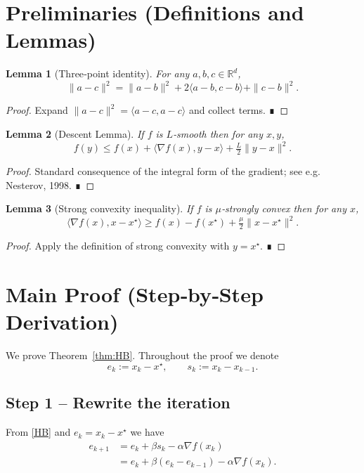 \documentclass{article}
\newtheorem{lemma}{Lemma}
\begin{document}
\section*{Preliminaries (Definitions and Lemmas)}
\begin{lemma}[Three‑point identity]\label{lem:3pt}
For any $a,b,c\in\mathbb{R}^{d}$,
\[
\|a-c\|^{2}= \|a-b\|^{2}+2\langle a-b,c-b\rangle+\|c-b\|^{2}.
\tag{L1}
\]
\end{lemma}
\begin{proof}
Expand $\|a-c\|^{2}=\langle a-c,a-c\rangle$ and collect terms. ∎
\end{proof}

\begin{lemma}[Descent Lemma]\label{lem:descent}
If $f$ is $L$‑smooth then for any $x,y$,
\[
f(y)\le f(x)+\langle\nabla f(x),y-x\rangle+\tfrac{L}{2}\|y-x\|^{2}.
\tag{L2}
\]
\end{lemma}
\begin{proof}
Standard consequence of the integral form of the gradient; see e.g. Nesterov,
1998. ∎
\end{proof}

\begin{lemma}[Strong convexity inequality]\label{lem:strong}
If $f$ is $\mu$‑strongly convex then for any $x$,
\[
\langle\nabla f(x),x-x^{\star}\rangle\ge
f(x)-f(x^{\star})+\tfrac{\mu}{2}\|x-x^{\star}\|^{2}.
\tag{L3}
\]
\end{lemma}
\begin{proof}
Apply the definition of strong convexity with $y=x^{\star}$. ∎
\end{proof}

\section*{Main Proof (Step‑by‑Step Derivation)}
We prove Theorem~\ref{thm:HB}.  Throughout the proof we denote
\[
e_{k}:=x_{k}-x^{\star},\qquad s_{k}:=x_{k}-x_{k-1}.
\]

\subsection*{Step 1 – Rewrite the iteration}
From \eqref{HB} and $e_{k}=x_{k}-x^{\star}$ we have
\begin{align}
e_{k+1}
&=e_{k}+\beta s_{k}-\alpha\nabla f(x_{k})  \nonumber\\
&=e_{k}+\beta(e_{k}-e_{k-1})-\alpha\nabla f(x_{k}).
\tag{S1}
\end{align}
\end{document}
